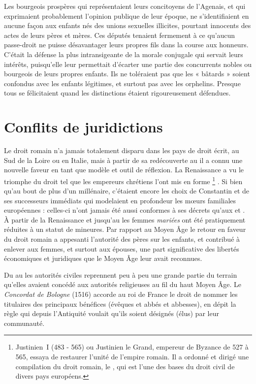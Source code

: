  Les bourgeois prospères qui représentaient leurs concitoyens de l'Agenais, et qui exprimaient probablement l'opinion publique de leur époque, ne s'identifiaient en aucune façon aux enfants nés des unions sexuelles illicites, pourtant innocents des actes de leurs pères et mères. Ces députés tenaient fermement à ce qu'aucun passe-droit ne puisse désavantager leurs propres fils dans la course aux honneurs. C'était la défense la plus intransigeante de la morale conjugale qui servait leurs intérêts, puisqu'elle leur permettait d'écarter une partie des concurrents nobles ou bourgeois de leurs propres enfants. Ils ne toléraient pas que les « bâtards » soient confondus avec les enfants légitimes, et surtout pas avec les orphelins. Presque tous se félicitaient quand les distinctions étaient rigoureusement défendues.
 
 

\section{Conflits de juridictions}

 Le droit romain n'a jamais totalement disparu dans les pays de droit écrit, au Sud de la Loire ou en Italie, mais à partir de sa redécouverte au  il a connu une nouvelle faveur en tant que modèle et outil de réflexion. La Renaissance a vu le triomphe du droit tel que les empereurs chrétiens l'ont mis en forme%
\footnote{Justinien~I\ier{} (483 - 565) ou Justinien le Grand, empereur de Byzance de 527 à 565, essaya de restaurer l'unité de l'empire romain. Il a ordonné et dirigé une compilation du droit romain, le , qui est l'une des bases du droit civil de divers pays européens.}%
. Si bien qu'au bout de plus d'un millénaire, c'étaient encore les choix de Constantin et de ses successeurs immédiats qui modelaient en profondeur les mœurs familiales européennes : celles-ci n'ont jamais été aussi conformes à ses décrets qu'aux  et . À partir de la Renaissance et jusqu'au  les femmes \emph{mariées} ont été pratiquement réduites à un statut de mineures. Par rapport au Moyen Âge le retour en faveur du droit romain a appesanti l'autorité des pères sur les enfants, et contribué à enlever aux femmes, et surtout aux épouses, une part significative des libertés économiques et juridiques que le Moyen Âge leur avait reconnues.

 Du  au  les autorités civiles reprennent peu à peu une grande partie du terrain qu'elles avaient concédé aux autorités religieuses au fil du haut Moyen Âge. Le \emph{Concordat de Bologne} (1516) accorde au roi de France le droit de nommer les titulaires des principaux bénéfices (évêques et abbés et abbesses), en dépit la règle qui depuis l'Antiquité voulait qu'ils soient désignés (élus) par leur communauté. 

